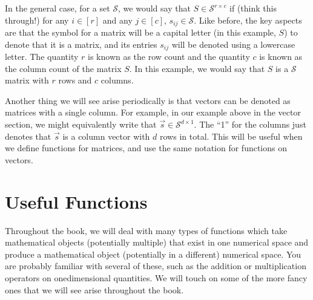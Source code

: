 \documentclass[letterpaper,10pt,english]{jupyterBook}
\begin{document}
\sphinxAtStartPar
In the general case, for a set \(\mathcal S\), we would say that \(S \in \mathcal S^{r \times c}\) if (think this through!) for any \(i \in [r]\) and any \(j \in [c]\), \(s_{ij} \in \mathcal S\). Like before, the key aspects are that the symbol for a matrix will be a capital letter (in this example, \(S\)) to denote that it is a matrix, and its entries \(s_{ij}\) will be denoted using a lowercase letter. The quantity \(r\) is known as the row count and the quantity \(c\) is known as the column count of the matrix \(S\). In this example, we would say that \(S\) is a \(\mathcal S\)\sphinxhyphen{}matrix with \(r\) rows and \(c\) columns.

\sphinxAtStartPar
Another thing we will see arise periodically is that vectors can be denoted as matrices with a single column. For example, in our example above in the vector section, we might equivalently write that \(\vec s \in \mathcal S^{d \times 1}\). The “1” for the columns just denotes that \(\vec s\) is a column vector with \(d\) rows in total. This will be useful when we define functions for matrices, and use the same notation for functions on vectors.


\section{Useful Functions}
\label{\detokenize{introduction/terminology:useful-functions}}
\sphinxAtStartPar
Throughout the book, we will deal with many types of functions which take mathematical objects (potentially multiple) that exist in one numerical space and produce a mathematical object (potentially in a different) numerical space. You are probably familiar with several of these, such as the addition or multiplication operators on one\sphinxhyphen{}dimensional quantities. We will touch on some of the more fancy ones that we will see arise throughout the book.
\end{document}
